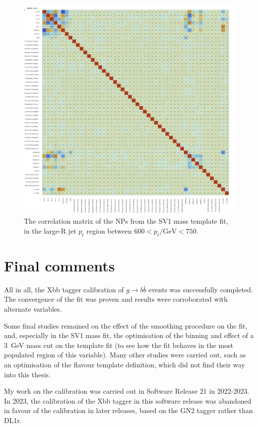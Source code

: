 \documentclass[10pt,a4paper]{book}
\begin{document}
\begin{figure}
    \centering
    \includegraphics[width=0.8\linewidth]{ftag/sv1Fit/correlation_matrix.png}
    \caption{The correlation matrix of the NPs from the SV1 mass template fit, in the large-R jet $p_t$ region between $600 < p_t/\text{GeV} < 750$.}
    \label{fig:correlation}
\end{figure}


\section{Final comments}

All in all, the Xbb tagger calibration of $g\rightarrow b\bar{b}$ events was successfully completed. The convergence of the fit was proven and results were corroborated with alternate variables.

Some final studies remained on the effect of the smoothing procedure on the fit, and, especially in the SV1 mass fit, the optimisation of the binning and effect of a 3~GeV mass cut on the template fit (to see how the fit behaves in the most populated region of this variable). Many other studies were carried out, such as an optimisation of the flavour template definition, which did not find their way into this thesis.

My work on the calibration was carried out in Software Release 21 in 2022-2023. In 2023, the calibration of the Xbb tagger in this software release was abandoned in favour of the calibration in later releases, based on the GN2 tagger rather than DL1r. 
\end{document}
